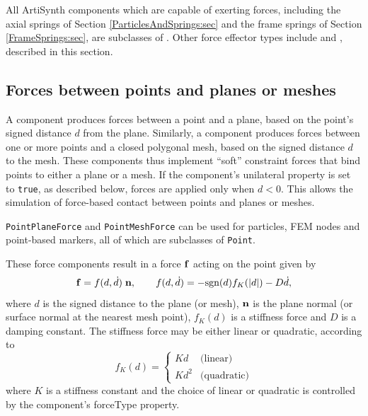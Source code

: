 All ArtiSynth components which are capable of exerting forces, including the
axial springs of Section \ref{ParticlesAndSprings:sec} and the frame springs of
Section \ref{FrameSprings:sec}, are subclasses of
. Other force effector
types include
 and
, described in this section.

\subsection{Forces between points and planes or meshes}

A  component produces forces between a point
and a plane, based on the point's signed distance $d$ from the plane.
Similarly, a  component produces forces
between one or more points and a closed polygonal mesh, based on the signed
distance $d$ to the mesh. These components thus implement ``soft'' constraint
forces that bind points to either a plane or a mesh. If the component's {\sf
unilateral} property is set to {\tt true}, as described below, forces are
applied only when $d < 0$. This allows the simulation of force-based contact
between points and planes or meshes.

\begin{sideblock}
{\tt PointPlaneForce} and {\tt PointMeshForce} can be used for particles, FEM
nodes and point-based markers, all of which are subclasses of {\tt Point}.
\end{sideblock}

These force components result in a force ${\bf f}$ acting on the point given by
%
\begin{equation*}
{\bf f} = f(d, \dot d) \; {\bf n}, \qquad
f(d, \dot d) = - \text{sgn}(d) f_K (|d|) - D \dot d,
\end{equation*}
%
where $d$ is the signed distance to the plane (or mesh), ${\bf n}$ is the plane
normal (or surface normal at the nearest mesh point), $f_K(d)$ is a stiffness
force and $D$ is a damping constant. The stiffness force may be either linear
or quadratic, according to
%
\begin{equation*}
f_K (d) =
\begin{cases}
K d & \text{(linear)} \\
K d^2 & \text{(quadratic)}
\end{cases}
\end{equation*}
%
where $K$ is a stiffness constant and the choice of linear or quadratic is
controlled by the component's {\sf forceType} property.

